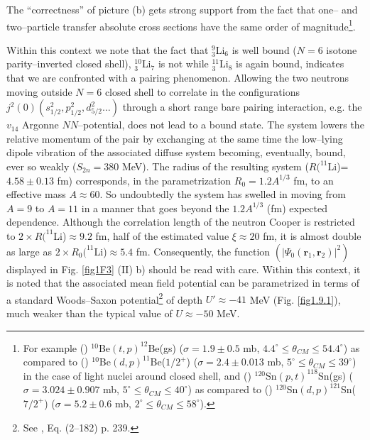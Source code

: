  The ``correctness'' of picture (b) gets strong support from  the fact that one-- and two--particle transfer  absolute cross sections have the same order of magnitude\footnote{For example (\cite{Fortune:94}) $^{10}$Be$(t,p)^{12}$Be(gs) ($\sigma=1.9\pm0.5$ mb, $4.4^\circ\leq\theta_{CM}\leq 54.4^\circ$) as compared to (\cite{Schmitt:13}) $^{10}$Be$(d,p)^{11}$Be($1/2^+$) ($\sigma=2.4\pm 0.013$ mb, $5^\circ\leq\theta_{CM}\leq 39^\circ$) in the case of light nuclei around closed shell, and (\cite{Bassani:65}) $^{120}$Sn$(p,t)^{118}$Sn(gs) ($\sigma=3.024\pm0.907$ mb, $5^\circ\leq\theta_{CM}\leq 40^\circ$) as compared to (\cite{Bechara:75}) $^{120}$Sn$(d,p)^{121}$Sn($7/2^+$) ($\sigma=5.2\pm0.6$ mb, $2^\circ\leq\theta_{CM}\leq 58^\circ$).}. 


 Within this context we note that the fact that $^9_3$Li$_6$ is well bound ($N=6$ isotone parity--inverted closed shell), $^{10}_3$Li$_7$ is not while $^{11}_3$Li$_8$ is again bound, indicates that we are confronted with a pairing phenomenon. Allowing the two neutrons moving outside $N=6$ closed shell to correlate in the configurations $j^2(0) (s_{1/2}^2, p_{1/2}^2, d_{5/2}^2\dots)$ through a short range bare pairing interaction, e.g. the $v_{14}$ Argonne $NN$--potential, does not lead to a bound state. The system lowers the relative momentum of the pair by exchanging at the same time the low--lying dipole vibration of the associated diffuse system becoming, eventually, bound, ever so weakly ($S_{2n}=380$ MeV). The radius of the resulting system ($R(^{11}$Li)=$4.58\pm 0.13$ fm) corresponds, in the parametrization $R_0=1.2 A^{1/3}$ fm, to an effective mass $A\approx 60$. So undoubtedly the system has swelled in moving from $A=9$ to $A=11$ in a manner that goes beyond the $1.2A^{1/3}$ (fm) expected dependence. Although the correlation length of the neutron Cooper is restricted to $2\times R(^{11}$Li)$\approx 9.2$ fm, half of the estimated value $\xi\approx 20$ fm, it is almost double as large as $2\times R_0(^{11}$Li)$\approx 5.4$ fm. Consequently, the function $(|\Psi_0(\mathbf r_1,\mathbf r_2)|^2)$ displayed  in Fig. \ref{fig1F3} (II) b) should be read with care.
Within this context, it is  noted that the associated mean field potential can be parametrized in terms of a standard Woods--Saxon potential\footnote{See \cite{Bohr:69}, Eq. (2--182) p. 239.} of depth $U'\approx-41$ MeV (Fig. \ref{fig1.9.1}), much weaker than the typical value of $U\approx-50$ MeV.

